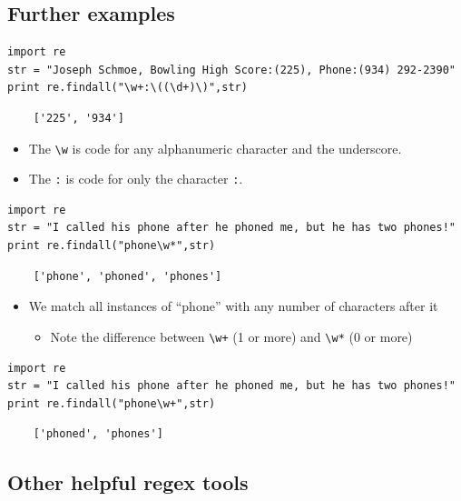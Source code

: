 \documentclass[11pt]{article}
\begin{document}
    
\subsection{Further examples}
\label{sec-3-2}


\begin{verbatim}
import re
str = "Joseph Schmoe, Bowling High Score:(225), Phone:(934) 292-2390"  
print re.findall("\w+:\((\d+)\)",str)
\end{verbatim}

\begin{verbatim}
    ['225', '934']
\end{verbatim}

\begin{itemize}
\item The \texttt{\textbackslash{}w} is code for any alphanumeric character and the underscore.
\item The \texttt{:} is code for only the character \texttt{:}.
\end{itemize}


\begin{verbatim}
import re
str = "I called his phone after he phoned me, but he has two phones!"  
print re.findall("phone\w*",str)
\end{verbatim}

\begin{verbatim}
    ['phone', 'phoned', 'phones']
\end{verbatim}

\begin{itemize}
\item We match all instances of ``phone'' with any number of characters
     after it
\begin{itemize}
\item Note the difference between \texttt{\textbackslash{}w+} (1 or more) and \texttt{\textbackslash{}w*} (0 or more)
\end{itemize}
\end{itemize}


\begin{verbatim}
import re
str = "I called his phone after he phoned me, but he has two phones!"  
print re.findall("phone\w+",str)
\end{verbatim}

\begin{verbatim}
    ['phoned', 'phones']
\end{verbatim}

   
\subsection{Other helpful regex tools}
\label{sec-3-3}
\end{document}
